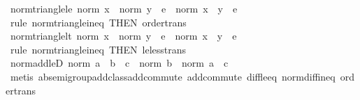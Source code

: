 \begin{isabellebody}
\endisadelimproof
\isanewline
{}\isamarkupfalse%
\ norm{\isacharunderscore}{\kern0pt}triangle{\isacharunderscore}{\kern0pt}le{\isacharcolon}{\kern0pt}\ {\isachardoublequoteopen}norm\ x\ {\isacharplus}{\kern0pt}\ norm\ y\ {\isasymle}\ e\ {\isasymLongrightarrow}\ norm\ {\isacharparenleft}{\kern0pt}x\ {\isacharplus}{\kern0pt}\ y{\isacharparenright}{\kern0pt}\ {\isasymle}\ e{\isachardoublequoteclose}\isanewline
%
\isadelimproof
\ \ %
\endisadelimproof
%
\isatagproof
{}\isamarkupfalse%
\ {\isacharparenleft}{\kern0pt}rule\ norm{\isacharunderscore}{\kern0pt}triangle{\isacharunderscore}{\kern0pt}ineq\ {\isacharbrackleft}{\kern0pt}THEN\ order{\isacharunderscore}{\kern0pt}trans{\isacharbrackright}{\kern0pt}{\isacharparenright}{\kern0pt}%
\endisatagproof
{\isafoldproof}%
%
\isadelimproof
\isanewline
%
\endisadelimproof
\isanewline
{}\isamarkupfalse%
\ norm{\isacharunderscore}{\kern0pt}triangle{\isacharunderscore}{\kern0pt}lt{\isacharcolon}{\kern0pt}\ {\isachardoublequoteopen}norm\ x\ {\isacharplus}{\kern0pt}\ norm\ y\ {\isacharless}{\kern0pt}\ e\ {\isasymLongrightarrow}\ norm\ {\isacharparenleft}{\kern0pt}x\ {\isacharplus}{\kern0pt}\ y{\isacharparenright}{\kern0pt}\ {\isacharless}{\kern0pt}\ e{\isachardoublequoteclose}\isanewline
%
\isadelimproof
\ \ %
\endisadelimproof
%
\isatagproof
{}\isamarkupfalse%
\ {\isacharparenleft}{\kern0pt}rule\ norm{\isacharunderscore}{\kern0pt}triangle{\isacharunderscore}{\kern0pt}ineq\ {\isacharbrackleft}{\kern0pt}THEN\ le{\isacharunderscore}{\kern0pt}less{\isacharunderscore}{\kern0pt}trans{\isacharbrackright}{\kern0pt}{\isacharparenright}{\kern0pt}%
\endisatagproof
{\isafoldproof}%
%
\isadelimproof
\isanewline
%
\endisadelimproof
\isanewline
{}\isamarkupfalse%
\ norm{\isacharunderscore}{\kern0pt}add{\isacharunderscore}{\kern0pt}leD{\isacharcolon}{\kern0pt}\ {\isachardoublequoteopen}norm\ {\isacharparenleft}{\kern0pt}a\ {\isacharplus}{\kern0pt}\ b{\isacharparenright}{\kern0pt}\ {\isasymle}\ c\ {\isasymLongrightarrow}\ norm\ b\ {\isasymle}\ norm\ a\ {\isacharplus}{\kern0pt}\ c{\isachardoublequoteclose}\isanewline
%
\isadelimproof
\ \ %
\endisadelimproof
%
\isatagproof
{}\isamarkupfalse%
\ {\isacharparenleft}{\kern0pt}metis\ ab{\isacharunderscore}{\kern0pt}semigroup{\isacharunderscore}{\kern0pt}add{\isacharunderscore}{\kern0pt}class{\isachardot}{\kern0pt}add{\isachardot}{\kern0pt}commute\ add{\isacharunderscore}{\kern0pt}commute\ diff{\isacharunderscore}{\kern0pt}le{\isacharunderscore}{\kern0pt}eq\ norm{\isacharunderscore}{\kern0pt}diff{\isacharunderscore}{\kern0pt}ineq\ order{\isacharunderscore}{\kern0pt}trans{\isacharparenright}{\kern0pt}%

\end{isabellebody}
